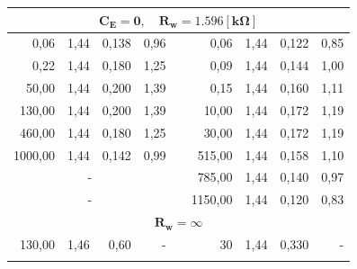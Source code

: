 \documentclass[a4paper,12pt]{article}
\begin{document}
\begin{table}[ht]
\begin{center}
\begin{tabular}{|r|r|r|r|r|r|r|r|r|}
    \multicolumn{9}{|c|}{\textbf{$\mathbf{C_E = 0}, \quad \mathbf{R_w=1.596[k\Omega]}$}} \\ \hline
    0,06 & 1,44 & 0,138 & 0,96 & & 0,06 & 1,44 & 0,122 & 0,85 \\ \cline{1-4} \cline{6-9}
    0,22 & 1,44 & 0,180 & 1,25 & & 0,09 & 1,44 & 0,144 & 1,00 \\ \cline{1-4} \cline{6-9}
    50,00 & 1,44 & 0,200 & 1,39 & & 0,15 & 1,44 & 0,160 & 1,11 \\ \cline{1-4} \cline{6-9}
    130,00 & 1,44 & 0,200 & 1,39 & & 10,00 & 1,44 & 0,172 & 1,19 \\ \cline{1-4} \cline{6-9}
    460,00 & 1,44 & 0,180 & 1,25 & & 30,00 & 1,44 & 0,172 & 1,19 \\ \cline{1-4} \cline{6-9}
    1000,00 & 1,44 & 0,142 & 0,99 & & 515,00 & 1,44 & 0,158 & 1,10 \\ \cline{1-4} \cline{6-9}
    \multicolumn{4}{|c|}{-} & & 785,00 & 1,44 & 0,140 & 0,97 \\ \cline{1-4} \cline{6-9}
    \multicolumn{4}{|c|}{-} & & 1150,00 & 1,44 & 0,120 & 0,83 \\ \hline
    \multicolumn{9}{|c|}{$\mathbf{R_w = \infty}$} \\ \hline
    130,00 & 1,46 & 0,60 & - & & 30 & 1,44 & 0,330 & - \\ \hline
     \multicolumn{9}{c}{} \\

 

  \end{tabular}
  \end{center}
  
\end{table}


\end{document}
